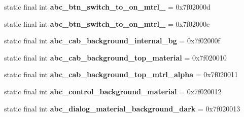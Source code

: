 \begin{DoxyCompactItemize}
\item 
\hypertarget{classandroid_1_1support_1_1design_1_1_r_1_1drawable_ae521666a21ed2608a23eca5d22f96ee3}{}static final int {\bfseries abc\+\_\+btn\+\_\+switch\+\_\+to\+\_\+on\+\_\+mtrl\+\_} = 0x7f02000d\label{classandroid_1_1support_1_1design_1_1_r_1_1drawable_ae521666a21ed2608a23eca5d22f96ee3}

\item 
\hypertarget{classandroid_1_1support_1_1design_1_1_r_1_1drawable_a5a3b8a81295542669662242978c175f7}{}static final int {\bfseries abc\+\_\+btn\+\_\+switch\+\_\+to\+\_\+on\+\_\+mtrl\+\_} = 0x7f02000e\label{classandroid_1_1support_1_1design_1_1_r_1_1drawable_a5a3b8a81295542669662242978c175f7}

\item 
\hypertarget{classandroid_1_1support_1_1design_1_1_r_1_1drawable_a98b531b7ea20497704028ad747e030f1}{}static final int {\bfseries abc\+\_\+cab\+\_\+background\+\_\+internal\+\_\+bg} = 0x7f02000f\label{classandroid_1_1support_1_1design_1_1_r_1_1drawable_a98b531b7ea20497704028ad747e030f1}

\item 
\hypertarget{classandroid_1_1support_1_1design_1_1_r_1_1drawable_a42e17569e7d1bb789f0520f927545b90}{}static final int {\bfseries abc\+\_\+cab\+\_\+background\+\_\+top\+\_\+material} = 0x7f020010\label{classandroid_1_1support_1_1design_1_1_r_1_1drawable_a42e17569e7d1bb789f0520f927545b90}

\item 
\hypertarget{classandroid_1_1support_1_1design_1_1_r_1_1drawable_a41acf92ce9b10b18e42741a302b12976}{}static final int {\bfseries abc\+\_\+cab\+\_\+background\+\_\+top\+\_\+mtrl\+\_\+alpha} = 0x7f020011\label{classandroid_1_1support_1_1design_1_1_r_1_1drawable_a41acf92ce9b10b18e42741a302b12976}

\item 
\hypertarget{classandroid_1_1support_1_1design_1_1_r_1_1drawable_a519683d8b9d2044003074890024582d5}{}static final int {\bfseries abc\+\_\+control\+\_\+background\+\_\+material} = 0x7f020012\label{classandroid_1_1support_1_1design_1_1_r_1_1drawable_a519683d8b9d2044003074890024582d5}

\item 
\hypertarget{classandroid_1_1support_1_1design_1_1_r_1_1drawable_aef714f3fefda4a0b961c2117d1966d2c}{}static final int {\bfseries abc\+\_\+dialog\+\_\+material\+\_\+background\+\_\+dark} = 0x7f020013\label{classandroid_1_1support_1_1design_1_1_r_1_1drawable_aef714f3fefda4a0b961c2117d1966d2c}


\end{DoxyCompactItemize}
